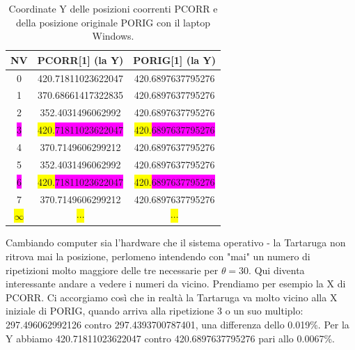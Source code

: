 \begin{table}[H]

\begin{center}
\begin{tabular}{| c | c | c |}
\hline
	NV & PCORR[1] (la Y) & PORIG[1] (la Y) \\ \hline
\hline
0 & 420.71811023622047 & 420.6897637795276 \\ \hline
1 & 370.68661417322835 & 420.6897637795276 \\ \hline
2 & 352.4031496062992 & 420.6897637795276 \\ \hline
\colorbox{magenta}{3} & \colorbox{yellow}{420.}\colorbox{magenta}{71811023622047} & \colorbox{yellow}{420.}\colorbox{magenta}{6897637795276} \\ \hline
4 & 370.7149606299212 & 420.6897637795276 \\ \hline
5 & 352.4031496062992 & 420.6897637795276 \\ \hline
\colorbox{magenta}{6} & \colorbox{yellow}{420.}\colorbox{magenta}{71811023622047} & \colorbox{yellow}{420.}\colorbox{magenta}{6897637795276} \\ \hline
7 & 370.7149606299212 & 420.6897637795276 \\ \hline
\colorbox{yellow}{$\infty$} & \colorbox{yellow}{$\cdots$} & \colorbox{yellow}{$\cdots$} \\
\hline
\end{tabular}
\caption{Coordinate Y delle posizioni coorrenti PCORR e della posizione originale PORIG con il laptop Windows.}
\end{center}
\end{table}

Cambiando computer sia l'hardware che il sistema operativo - la Tartaruga non
ritrova mai la posizione, perlomeno intendendo con "mai" un numero di
ripetizioni molto maggiore delle tre necessarie per $\theta=30$. Qui diventa
interessante andare a vedere i numeri da vicino. Prendiamo per esempio la X di
PCORR. Ci accorgiamo così che in realtà la Tartaruga va molto vicino alla X
iniziale di PORIG, quando arriva alla ripetizione 3 o un suo multiplo:
297.496062992126 contro 297.4393700787401, una differenza dello 0.019\%. Per la
Y abbiamo 420.71811023622047 contro 420.6897637795276 pari allo 0.0067\%.

